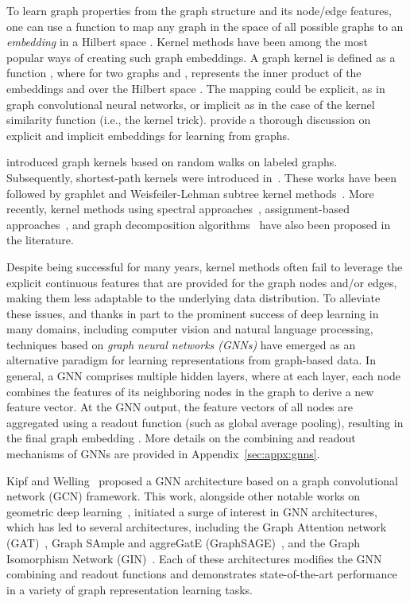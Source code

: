 \documentclass[table]{article} \usepackage{iclr2021_conference,times}
\begin{document}
To learn graph properties from the graph structure and its node/edge features, one can use a function  to map any graph  in the space of all possible graphs  to an \emph{embedding}  in a Hilbert space . Kernel methods have been among the most popular ways of creating such graph embeddings. A graph kernel is defined as a function , where for two graphs  and ,  represents the inner product of the embeddings  and  over the Hilbert space . The mapping  could be explicit, as in graph convolutional neural networks, or implicit as in the case of the kernel similarity function  (i.e., the kernel trick). \cite{kriege2014explicit} provide a thorough discussion on explicit and implicit embeddings for learning from graphs.

\cite{kashima2003marginalized} introduced graph kernels based on random walks on labeled graphs. Subsequently, shortest-path kernels were introduced in~\citep{borgwardt2005shortest}. These works have been followed by graphlet and Weisfeiler-Lehman subtree kernel methods~\citep{shervashidze2009efficient, shervashidze2011weisfeiler, morris2017glocalized}. More recently, kernel methods using spectral approaches~\citep{kondor2016multiscale}, assignment-based approaches~\citep{kriege2016valid, nikolentzos2017matching}, and graph decomposition algorithms~\citep{nikolentzos2018degeneracy} have also been proposed in the literature.  

Despite being successful for many years, kernel methods often fail to leverage the explicit continuous features that are provided for the graph nodes and/or edges, making them less adaptable to the underlying data distribution. To alleviate these issues, and thanks in part to the prominent success of deep learning in many domains, including computer vision and natural language processing, techniques based on \emph{graph neural networks (GNNs)} have emerged as an alternative paradigm for learning representations from graph-based data. In general, a GNN comprises multiple hidden layers, where at each layer, each node combines the features of its neighboring nodes in the graph to derive a new feature vector. At the GNN output, the feature vectors of all nodes are aggregated using a readout function (such as global average pooling), resulting in the final graph embedding . More details on the combining and readout mechanisms of GNNs are provided in Appendix~\ref{sec:appx:gnns}.

Kipf and Welling~\citep{kipf2016semi} proposed a GNN architecture based on a graph convolutional network (GCN) framework. This work, alongside other notable works on geometric deep learning~\citep{defferrard2016convolutional}, initiated a surge of interest in GNN architectures, which has led to several architectures, including the Graph Attention network (GAT)~\citep{velivckovic2017graph}, Graph SAmple and aggreGatE (GraphSAGE)~\citep{hamilton2017inductive}, and the Graph Isomorphism Network (GIN)~\citep{xu2018how}. Each of these architectures modifies the GNN combining and readout functions and demonstrates state-of-the-art performance in a variety of graph representation learning tasks.
\end{document}
